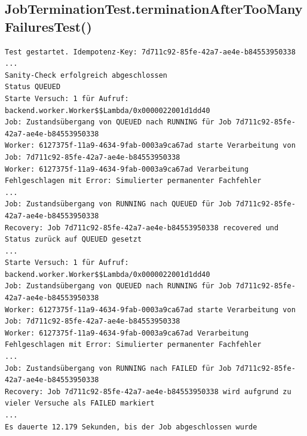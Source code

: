\subsection*{JobTerminationTest.terminationAfterTooManyFailuresTest()}
\label{subsec:testlog_z9}
\begin{lstlisting}[language={}, style=logs, numbers=none]
Test gestartet. Idempotenz-Key: 7d711c92-85fe-42a7-ae4e-b84553950338
...
Sanity-Check erfolgreich abgeschlossen
Status QUEUED
Starte Versuch: 1 für Aufruf: backend.worker.Worker$$Lambda/0x0000022001d1dd40
Job: Zustandsübergang von QUEUED nach RUNNING für Job 7d711c92-85fe-42a7-ae4e-b84553950338
Worker: 6127375f-11a9-4634-9fab-0003a9ca67ad starte Verarbeitung von Job: 7d711c92-85fe-42a7-ae4e-b84553950338
Worker: 6127375f-11a9-4634-9fab-0003a9ca67ad Verarbeitung Fehlgeschlagen mit Error: Simulierter permanenter Fachfehler
...
Job: Zustandsübergang von RUNNING nach QUEUED für Job 7d711c92-85fe-42a7-ae4e-b84553950338
Recovery: Job 7d711c92-85fe-42a7-ae4e-b84553950338 recovered und Status zurück auf QUEUED gesetzt
...
Starte Versuch: 1 für Aufruf: backend.worker.Worker$$Lambda/0x0000022001d1dd40
Job: Zustandsübergang von QUEUED nach RUNNING für Job 7d711c92-85fe-42a7-ae4e-b84553950338
Worker: 6127375f-11a9-4634-9fab-0003a9ca67ad starte Verarbeitung von Job: 7d711c92-85fe-42a7-ae4e-b84553950338
Worker: 6127375f-11a9-4634-9fab-0003a9ca67ad Verarbeitung Fehlgeschlagen mit Error: Simulierter permanenter Fachfehler
...
Job: Zustandsübergang von RUNNING nach FAILED für Job 7d711c92-85fe-42a7-ae4e-b84553950338
Recovery: Job 7d711c92-85fe-42a7-ae4e-b84553950338 wird aufgrund zu vieler Versuche als FAILED markiert
...
Es dauerte 12.179 Sekunden, bis der Job abgeschlossen wurde
\end{lstlisting}

